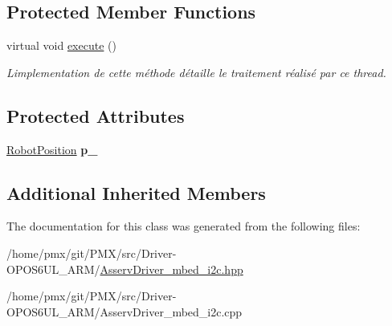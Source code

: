 \subsection*{Protected Member Functions}
\begin{DoxyCompactItemize}
\item 
\mbox{\label{classAsservDriver__mbed__i2c_aceeb058d409ef084ae4cc591c21befab}} 
virtual void \hyperlink{classAsservDriver__mbed__i2c_aceeb058d409ef084ae4cc591c21befab}{execute} ()
\begin{DoxyCompactList}\small\item\em L\textquotesingle{}implementation de cette méthode détaille le traitement réalisé par ce thread. \end{DoxyCompactList}\end{DoxyCompactItemize}
\subsection*{Protected Attributes}
\begin{DoxyCompactItemize}
\item 
\mbox{\label{classAsservDriver__mbed__i2c_a8d454fc016c63fc6658a841d9d95fbd6}} 
\hyperlink{structRobotPosition}{Robot\+Position} {\bfseries p\+\_\+}
\end{DoxyCompactItemize}
\subsection*{Additional Inherited Members}


The documentation for this class was generated from the following files\+:\begin{DoxyCompactItemize}
\item 
/home/pmx/git/\+P\+M\+X/src/\+Driver-\/\+O\+P\+O\+S6\+U\+L\+\_\+\+A\+R\+M/\hyperlink{AsservDriver__mbed__i2c_8hpp}{Asserv\+Driver\+\_\+mbed\+\_\+i2c.\+hpp}\item 
/home/pmx/git/\+P\+M\+X/src/\+Driver-\/\+O\+P\+O\+S6\+U\+L\+\_\+\+A\+R\+M/Asserv\+Driver\+\_\+mbed\+\_\+i2c.\+cpp\end{DoxyCompactItemize}
